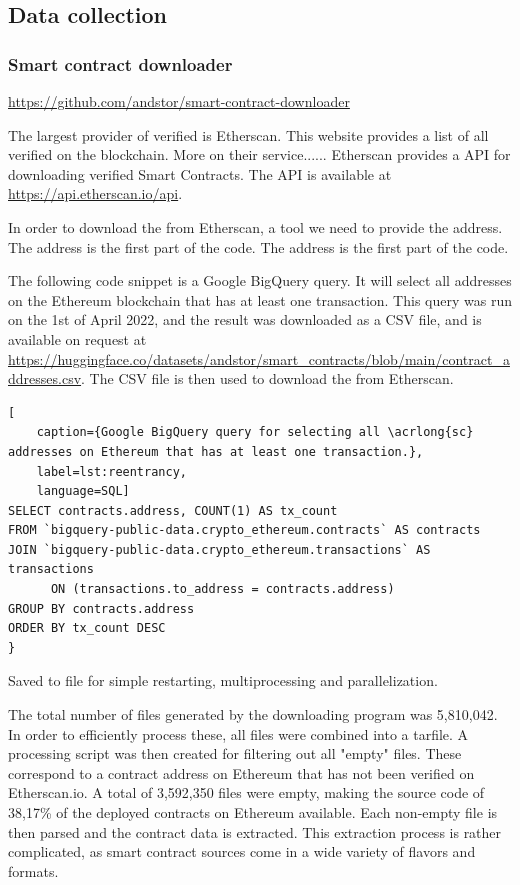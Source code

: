 \subsection{Data collection}
\label{sec:data-collection}

\subsubsection{Smart contract downloader}
\label{sec:smart-contract-downloader}
\url{https://github.com/andstor/smart-contract-downloader}


The largest provider of verified  is Etherscan. This website provides a list of all verified  on the blockchain. More on their service...... Etherscan provides a API for downloading verified Smart Contracts. The API is available at \url{https://api.etherscan.io/api}.

In order to download the  from Etherscan, a tool we need to provide the  address. The address is the first part of the  code. The address is the first part of the  code.

The following code snippet is a Google BigQuery query. It will select all  addresses on the Ethereum blockchain that has at least one transaction. This query was run on the 1st of April 2022, and the result was downloaded as a CSV file, and is available on request at \url{https://huggingface.co/datasets/andstor/smart_contracts/blob/main/contract_addresses.csv}. The CSV file is then used to download the  from Etherscan.

\begin{lstlisting}[
    caption={Google BigQuery query for selecting all \acrlong{sc} addresses on Ethereum that has at least one transaction.},
    label=lst:reentrancy,
    language=SQL]
SELECT contracts.address, COUNT(1) AS tx_count
FROM `bigquery-public-data.crypto_ethereum.contracts` AS contracts
JOIN `bigquery-public-data.crypto_ethereum.transactions` AS transactions 
      ON (transactions.to_address = contracts.address)
GROUP BY contracts.address
ORDER BY tx_count DESC
}
\end{lstlisting}

Saved to file for simple restarting, multiprocessing and parallelization.

The total number of files generated by the downloading program was 5,810,042. In order to efficiently process these, all files were combined into a tarfile. A processing script was then created for filtering out all "empty" files. These correspond to a contract address on Ethereum that has not been verified on Etherscan.io. A total of 3,592,350 files were empty, making the source code of 38,17\% of the deployed contracts on Ethereum available. Each non-empty file is then parsed and the contract data is extracted. This extraction process is rather complicated, as smart contract sources come in a wide variety of flavors and formats.

